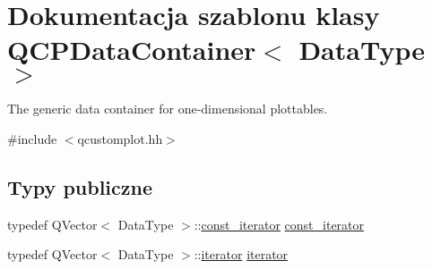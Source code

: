 \hypertarget{class_q_c_p_data_container}{}\section{Dokumentacja szablonu klasy Q\+C\+P\+Data\+Container$<$ Data\+Type $>$}
\label{class_q_c_p_data_container}


The generic data container for one-\/dimensional plottables.  




{\ttfamily \#include $<$qcustomplot.\+hh$>$}

\subsection*{Typy publiczne}
\begin{DoxyCompactItemize}
\item 
typedef Q\+Vector$<$ Data\+Type $>$\+::\hyperlink{class_q_c_p_data_container_ae40a91f5cb0bcac61d727427449b7d15}{const\+\_\+iterator} \hyperlink{class_q_c_p_data_container_ae40a91f5cb0bcac61d727427449b7d15}{const\+\_\+iterator}
\item 
typedef Q\+Vector$<$ Data\+Type $>$\+::\hyperlink{class_q_c_p_data_container_a1bb453c3ae37d1ee5268878acb3a9d29}{iterator} \hyperlink{class_q_c_p_data_container_a1bb453c3ae37d1ee5268878acb3a9d29}{iterator}
\end{DoxyCompactItemize}
